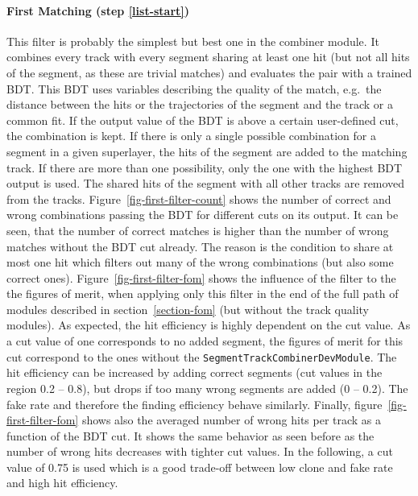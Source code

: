 \paragraph{First Matching (step \ref{list-start})}
This filter is probably the simplest but best one in the combiner module. It combines every track with every segment sharing at least one hit (but not all hits of the segment, as these are trivial matches) and evaluates the pair with a trained BDT. This BDT uses variables describing the quality of the match, e.g.\ the distance between the hits or the trajectories of the segment and the track or a common fit. If the output value of the BDT is above a certain user-defined cut, the combination is kept. If there is only a single possible combination for a segment in a given superlayer, the hits of the segment are added to the matching track. If there are more than one possibility, only the one with the highest BDT output is used. The shared hits of the segment with all other tracks are removed from the tracks. Figure~\ref{fig-first-filter-count} shows the number of correct and wrong combinations passing the BDT for different cuts on its output. It can be seen, that the number of correct matches is higher than the number of wrong matches without the BDT cut already. The reason is the condition to share at most one hit which filters out many of the wrong combinations (but also some correct ones). Figure~\ref{fig-first-filter-fom} shows the influence of the filter to the the figures of merit, when applying only this  filter in the end of the full path of modules described in section~\ref{section-fom} (but without the track quality modules). As expected, the hit efficiency is highly dependent on the cut value. As a cut value of one corresponds to no added segment, the figures of merit for this cut correspond to the ones without the \texttt{SegmentTrackCombinerDevModule}. The hit efficiency can be increased by adding correct segments (cut values in the region 0.2 -- 0.8), but drops if too many wrong segments are added (0 -- 0.2). The fake rate and therefore the finding efficiency behave similarly. Finally, figure~\ref{fig-first-filter-fom} shows also the averaged number of wrong hits per track as a function of the BDT cut. It shows the same behavior as seen before as the number of wrong hits decreases with tighter cut values. In the following, a cut value of 0.75 is used which is a good trade-off between low clone and fake rate and high hit efficiency.

